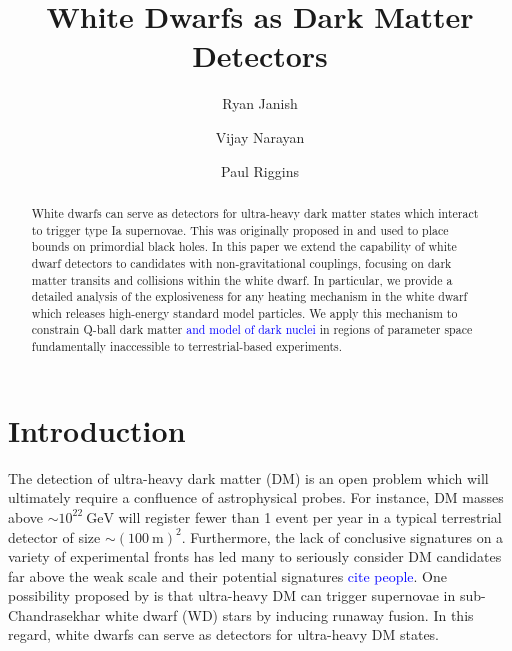 \documentclass[twocolumn,showpacs,preprintnumbers,amsmath,amssymb,prd]{revtex4}
\newcommand{\GeV}{\text{GeV}}
\begin{document}
\title{White Dwarfs as Dark Matter Detectors}


\author{Ryan Janish}

\author{Vijay Narayan}

\author{Paul Riggins}

\begin{abstract}

White dwarfs can serve as detectors for ultra-heavy dark matter states which interact to trigger type Ia supernovae. This was originally proposed in \cite{Graham:2015apa} and used to  place bounds on primordial black holes. In this paper we extend the capability of white dwarf detectors to candidates with non-gravitational couplings, focusing on dark matter transits and collisions within the white dwarf. In particular, we provide a detailed analysis of the explosiveness for any heating mechanism in the white dwarf which releases high-energy standard model particles. We apply this mechanism to constrain Q-ball dark matter \textcolor{blue}{and model of dark nuclei} in regions of parameter space fundamentally inaccessible to terrestrial-based experiments.

\end{abstract}
\maketitle


\section{Introduction}
\label{sec:Introduction}

The detection of ultra-heavy dark matter (DM) is an open problem which will ultimately require a confluence of astrophysical probes. For instance, DM masses above $\sim 10^{22} ~\GeV$ will register fewer than 1 event per year in a typical terrestrial detector of size $\sim (100 ~\text{m})^2$. Furthermore, the lack of conclusive signatures on a variety of experimental fronts has led many to seriously consider DM candidates far above the weak scale and their potential signatures \textcolor{blue}{cite people}. One possibility proposed by \cite{Graham:2015apa} is that ultra-heavy DM can trigger supernovae in sub-Chandrasekhar white dwarf (WD) stars by inducing runaway fusion.  In this regard, white dwarfs can serve as detectors for ultra-heavy DM states.
\end{document}
